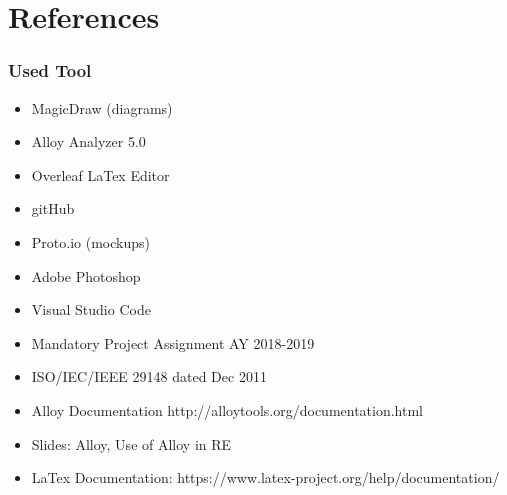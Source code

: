\documentclass[a4paper]{article}
\begin{document}
\section{References}

\subsubsection{Used Tool}

\begin{itemize}
    \item MagicDraw (diagrams)
    \item Alloy Analyzer 5.0
    \item Overleaf LaTex Editor
    \item gitHub
    \item Proto.io (mockups)
    \item Adobe Photoshop
    \item Visual Studio Code
    
\end{itemize}

\begin{itemize}
    \item Mandatory Project Assignment AY 2018-2019
    \item ISO/IEC/IEEE 29148 dated Dec 2011
    \item Alloy Documentation http://alloytools.org/documentation.html
    \item Slides: Alloy, Use of Alloy in RE
    \item LaTex Documentation: https://www.latex-project.org/help/documentation/
    
\end{itemize}
\end{document}
